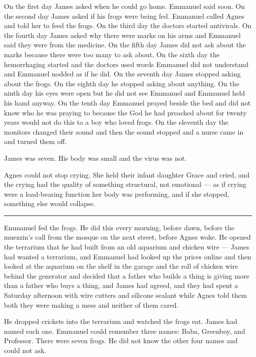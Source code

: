 \documentclass[11pt]{article}
\begin{document}
On the first day James asked when he could go home. Emmanuel said soon. On the second day James asked if his frogs were being fed. Emmanuel called Agnes and told her to feed the frogs. On the third day the doctors started antivirals. On the fourth day James asked why there were marks on his arms and Emmanuel said they were from the medicine. On the fifth day James did not ask about the marks because there were too many to ask about. On the sixth day the hemorrhaging started and the doctors used words Emmanuel did not understand and Emmanuel nodded as if he did. On the seventh day James stopped asking about the frogs. On the eighth day he stopped asking about anything. On the ninth day his eyes were open but he did not see Emmanuel and Emmanuel held his hand anyway. On the tenth day Emmanuel prayed beside the bed and did not know who he was praying to because the God he had preached about for twenty years would not do this to a boy who loved frogs. On the eleventh day the monitors changed their sound and then the sound stopped and a nurse came in and turned them off.

James was seven. His body was small and the virus was not.

Agnes could not stop crying. She held their infant daughter Grace and cried, and the crying had the quality of something structural, not emotional --- as if crying were a load-bearing function her body was performing, and if she stopped, something else would collapse.

\begin{center}\rule{0.3\linewidth}{0.4pt}\end{center}

Emmanuel fed the frogs. He did this every morning, before dawn, before the muezzin's call from the mosque on the next street, before Agnes woke. He opened the terrarium that he had built from an old aquarium and chicken wire --- James had wanted a terrarium, and Emmanuel had looked up the prices online and then looked at the aquarium on the shelf in the garage and the roll of chicken wire behind the generator and decided that a father who builds a thing is giving more than a father who buys a thing, and James had agreed, and they had spent a Saturday afternoon with wire cutters and silicone sealant while Agnes told them both they were making a mess and neither of them cared.

He dropped crickets into the terrarium and watched the frogs eat. James had named each one. Emmanuel could remember three names: Baba, Greenboy, and Professor. There were seven frogs. He did not know the other four names and could not ask.
\end{document}
